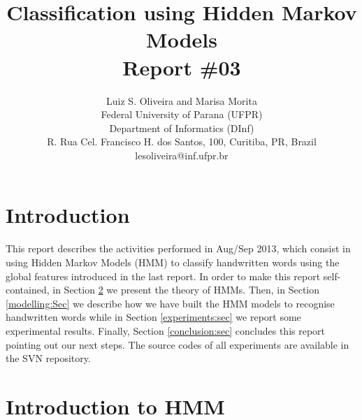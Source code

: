 \documentclass{article}[14pt, oneside, a4paper, times]
\begin{document}
\title{Classification using Hidden Markov Models 
\\ \large Report \#03}
\author{Luiz S. Oliveira and Marisa Morita  
\\
\vspace {-10pt}
Federal University of Parana (UFPR)\\
\vspace {-10pt}
Department of Informatics (DInf)\\
\vspace {-10pt}
R. Rua Cel. Francisco H. dos Santos, 100, Curitiba, PR, Brazil \\
lesoliveira@inf.ufpr.br \\ 
}


\date{}
\maketitle
\thispagestyle{empty}





\section{Introduction} 

This report describes the activities performed in Aug/Sep 2013, which consist in using Hidden Markov Models (HMM) to classify handwritten words using the global features introduced in the last report. In order to make this report self-contained, in Section \ref{hmm-theory:sec} we present the theory of HMMs. Then, in Section \ref{modelling:Sec} we describe how we have built the HMM models to recognise handwritten words while in Section \ref{experiments:sec} we report some experimental results. Finally, Section \ref{conclusion:sec} concludes this report pointing out our next steps. The source codes of all experiments are available in the SVN repository. 





\section{Introduction to HMM}
\label{hmm-theory:sec}
\end{document}
